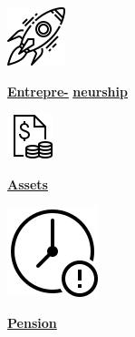 \documentclass[
]{article}
\begin{document}
\begin{minipage}[c][4.2cm][t]{2.1cm}\begin{mybox}\centering

\vspace{.3cm}
\includegraphics[height=.75cm]{entrepreneur.png}

\vspace{.3cm}
\fontsize{7.5}{1}\selectfont   
\textbf{\underline{\href{https://genderdata.worldbank.org/indicators/sg-law-indx-en}{Entrepre-}}}
\textbf{\underline{\href{https://genderdata.worldbank.org/indicators/sg-law-indx-en}{neurship}}}\normalsize 

\vspace{6pt}
\fontsize{15}{1}\selectfont 

\centering{}
\vspace{.3cm}
\normalsize\end{mybox}\end{minipage}
\begin{minipage}[c][4.2cm][t]{2.1cm}\begin{mybox}\centering
\vspace{.3cm}
\includegraphics[height=.75cm]{assets.png}

\vspace{.45cm}
\fontsize{7.5}{1}\selectfont   
\textbf{\underline{\href{https://genderdata.worldbank.org/indicators/sg-law-indx-as}{Assets}}}
  
\normalsize 
\vspace{17pt}
\fontsize{14}{1}\selectfont 
\centering{}

\vspace{.3cm}
\normalsize\end{mybox}\end{minipage}
\begin{minipage}[c][4.2cm][t]{2.1cm}\begin{mybox}\centering

\vspace{.3cm}
\includegraphics[height=.75cm]{pension.png}

\vspace{.3cm}
\fontsize{7.5}{1}\selectfont   
\textbf{\underline{\href{https://genderdata.worldbank.org/indicators/sg-law-indx-pe}{Pension}}}\normalsize 

\vspace{18pt}
\fontsize{14}{1}\selectfont 
\centering{}

\vspace{.3cm}
\normalsize\end{mybox}\end{minipage}
\end{document}
